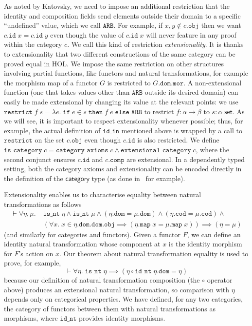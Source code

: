 \documentclass[twoside,titlepage,11pt]{article}
\begin{document}
As noted by Katovsky, we need to impose an additional restriction that the identity and composition fields send elements outside their domain to a specific ``undefined'' value, which we call $\mathtt{ARB}$.
For example, if $x,y\notin c.\mathtt{obj}$ then we want $c.\mathtt{id}\;x=c.\mathtt{id}\;y$ even though the value of $c.\mathtt{id}\;x$ will never feature in any proof within the category $c$.
We call this kind of restriction \emph{extensionality}.
It is thanks to extensionality that two different constructions of the same category can be proved equal in HOL.
We impose the same restriction on other structures involving partial functions, like functors and natural transformations, for example the morphism map of a functor $G$ is restricted to $G.\mathtt{dom}.\mathtt{mor}$.
A non-extensional function (one that takes values other than $\mathtt{ARB}$ outside its desired domain) can easily be made extensional by changing its value at the relevant points: we use $\mathtt{restrict}\;f\;s=\lambda{e}.\;\mathtt{if}\;e\in s\;\mathtt{then}\;f\;e\;\mathtt{else}\;\mathtt{ARB}$ to restrict $f:\alpha\to\beta$ to $s:\alpha\;\mathsf{set}$.
As we will see, it is important to respect extensionality whenever possible; thus, for example, the actual definition of $\mathtt{id\_in}$ mentioned above is wrapped by a call to $\mathtt{restrict}$ on the set $c.\mathtt{obj}$ even though $c.\mathtt{id}$ is also restricted.
We define $\mathtt{is\_category}\;c=\mathtt{category\_axioms}\;c\land\mathtt{extensional\_category}\;c$, where the second conjunct ensures $c.\mathtt{id}$ and $c.\mathtt{comp}$ are extensional.
In a dependently typed setting, both the category axioms and extensionality can be encoded directly in the definition of the $\mathsf{category}$ type (as done in~\cite{DBLP:conf/birthday/HuetS00,Sozeau,Megacz} for example).

Extensionality enables us to characterise equality between natural transformations as follows
\begin{align*}
\vdash\forall{\eta,\mu}.\;&\mathtt{is\_nt}\;\eta\land\mathtt{is\_nt}\;\mu\land(\eta.\mathtt{dom} = \mu.\mathtt{dom})\land(\eta.\mathtt{cod} = \mu.\mathtt{cod})\land{}\\
&(\forall{x}.\;x\in \eta.\mathtt{dom}.\mathtt{dom}.\mathtt{obj}\implies(\eta.\mathtt{map}\;x= \mu.\mathtt{map}\;x))\implies (\eta = \mu)
\end{align*}
(and similarly for categories and functors).
Given a functor $F$, we can define an identity natural transformation whose component at $x$ is the identity morphism for $F$'s action on $x$.
Our theorem about natural transformation equality is used to prove, for example, 
\[\vdash\forall{\eta}.\;\mathtt{is\_nt}\;\eta\implies(\eta\circ\mathtt{id\_nt}\;\eta.\mathtt{dom} = \eta)\]
because our definition of natural transformation composition (the $\circ$ operator above) produces an extensional natural transformation, so comparison with $\eta$ depends only on categorical properties.
We have defined, for any two categories, the category of functors between them with natural transformations as morphisms, where $\mathtt{id\_nt}$ provides identity morphisms.
\end{document}
